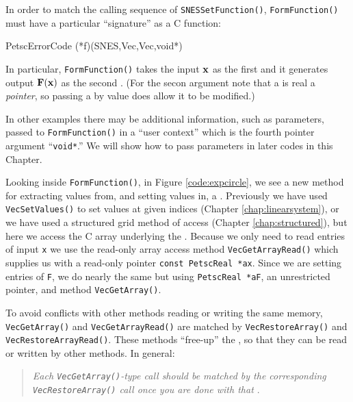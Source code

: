 In order to match the calling sequence of \texttt{SNESSetFunction()}, \texttt{FormFunction()} must have a particular ``signature'' as a C function:
\begin{code}
PetscErrorCode (*f)(SNES,Vec,Vec,void*)
\end{code}
In particular, \texttt{FormFunction()} takes the input $\mathbf{x}$ as the first \pVec and it generates output $\mathbf{F}(\mathbf{x})$ as the second \pVec.  (For the secon \pVec argument note that a \pVec is real a \emph{pointer}, so passing a \pVec by value does allow it to be modified.)

In other examples there may be additional information, such as parameters, passed to \texttt{FormFunction()} in a ``user context'' which is the fourth pointer argument ``\texttt{void*}.''  We will show how to pass parameters in later codes in this Chapter.

Looking inside \texttt{FormFunction()}, in Figure \ref{code:expcircle}, we see a new method for extracting values from, and setting values in, a \pVec.  Previously we have used \texttt{VecSetValues()} to set values at given indices (Chapter \ref{chap:linearsystem}), or we have used a \pDMDA structured grid method of access (Chapter \ref{chap:structured}), but here we access the C array underlying the \pVec.  Because we only need to read entries of input \pVec \texttt{x} we use the read-only array access method \texttt{VecGetArrayRead()} which supplies us with a read-only pointer \texttt{const PetscReal *ax}.  Since we are setting entries of \pVec \texttt{F}, we do nearly the same but using \texttt{PetscReal *aF}, an unrestricted pointer, and method \texttt{VecGetArray()}.

To avoid conflicts with other methods reading or writing the same memory, \texttt{VecGetArray()} and \texttt{VecGetArrayRead()} are matched by \texttt{VecRestoreArray()} and \texttt{VecRestoreArrayRead()}.  These methods ``free-up''  the \pVecs, so that they can be read or written by other methods.  In general:
\begin{quote}
\emph{Each \emph{\texttt{VecGetArray()}}-type call should be matched by the corresponding \emph{\texttt{VecRestoreArray()}} call once you are done with that \emph{\pVec}}.
\end{quote}

